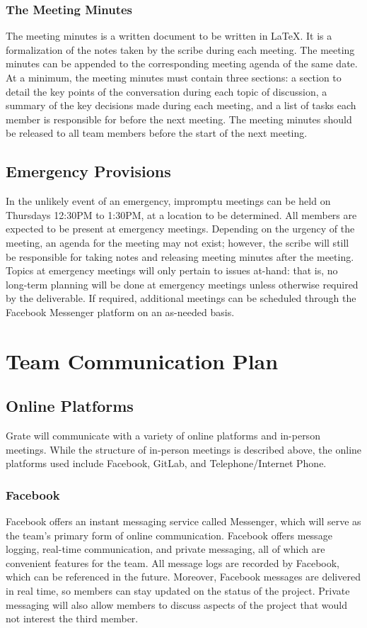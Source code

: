 \documentclass{article}
\begin{document}
\subsubsection{The Meeting Minutes}
The meeting minutes is a written document to be written in \LaTeX. It is a 
formalization of the notes taken by the scribe during each meeting. The meeting 
minutes can be appended to the corresponding meeting agenda of the same date. At 
a minimum, the meeting minutes must contain three sections: a section to detail 
the key points of the conversation during each topic of discussion, a summary of 
the key decisions made during each meeting, and a list of tasks each member is 
responsible for before the next meeting. The meeting minutes should be released 
to all team members before the start of the next meeting.

\subsection{Emergency Provisions}
In the unlikely event of an emergency, impromptu meetings can be held on 
Thursdays 12:30PM to 1:30PM, at a location to be determined. All members are 
expected to be present at emergency meetings. Depending on the urgency of the 
meeting, an agenda for the meeting may not exist; however, the scribe will still 
be responsible for taking notes and releasing meeting minutes after the meeting. 
Topics at emergency meetings will only pertain to issues at-hand: that is, no 
long-term planning will be done at emergency meetings unless otherwise required 
by the deliverable. If required, additional meetings can be scheduled through 
the Facebook Messenger platform on an as-needed basis.

\section{Team Communication Plan}
\subsection{Online Platforms}
Grate will communicate with a variety of online platforms and in-person 
meetings. While the structure of in-person meetings is described above, the 
online platforms used include Facebook, GitLab, and Telephone/Internet Phone.

\subsubsection{Facebook}
Facebook offers an instant messaging service called Messenger, which will serve 
as the team's primary form of online communication. Facebook offers message 
logging, real-time communication, and private messaging, all of which are 
convenient features for the team. All message logs are recorded by Facebook, 
which can be referenced in the future. Moreover, Facebook messages are delivered 
in real time, so members can stay updated on the status of the project. Private 
messaging will also allow members to discuss aspects of the project that would 
not interest the third member.
\end{document}
